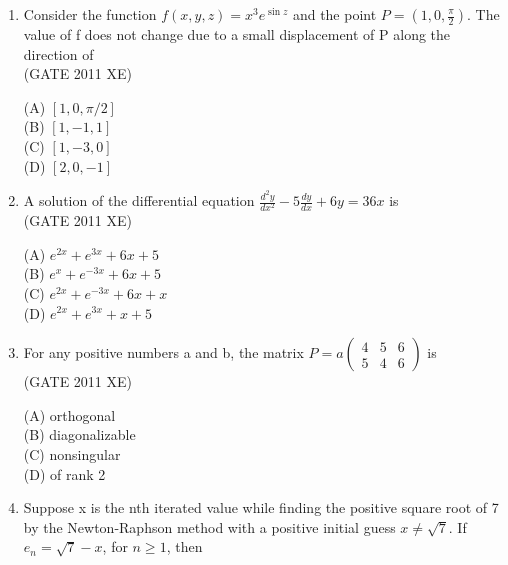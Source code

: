 \documentclass[journal,12pt,onecolumn]{IEEEtran}
\newcommand{\myvec}[1]{\begin{pmatrix}#1\end{pmatrix}}
\begin{document}
\begin{enumerate}
\hfill{(GATE 2011 XE)} \\
\begin{multicols}{4}
(A) $2\pi i$ \\
(B) $20\pi i$ \\
(C) $13\pi i$ \\
(D) 0
\end{multicols}

\item Consider the function $f(x,y,z) = x^3 e^{\sin z}$ and the point $P = (1,0, \frac{\pi}{2})$. The value of f does not change due to a small displacement of P along the direction of \\

\hfill{(GATE 2011 XE)} \\
\begin{multicols}{4}
(A) $[1,0,\pi/2]$ \\
(B) $[1,-1,1]$ \\
(C) $[1,-3,0]$ \\
(D) $[2,0,-1]$
\end{multicols}

\newpage

\item A solution of the differential equation $\frac{d^2 y}{dx^2} - 5 \frac{dy}{dx} + 6y = 36x$ is \\

\hfill{(GATE 2011 XE)} \\
\begin{multicols}{4}
(A) $e^{2x} + e^{3x} + 6x + 5$ \\
(B) $e^x + e^{-3x} + 6x + 5$ \\
(C) $e^{2x} + e^{-3x} + 6x + x$ \\
(D) $e^{2x} + e^{3x} + x + 5$
\end{multicols}

\item For any positive numbers a and b, the matrix 
$P = a\myvec{4 & 5 & 6 \\ 5 & 4 & 6}$ is \\

\hfill{(GATE 2011 XE)} \\
\begin{multicols}{4}
(A) orthogonal \\
(B) diagonalizable \\
(C) nonsingular \\
(D) of rank 2
\end{multicols}

\item Suppose x is the nth iterated value while finding the positive square root of 7 by the Newton-Raphson method with a positive initial guess $x \neq \sqrt{7}$. If $e_n = \sqrt{7} - x$, for $n \geq 1$, then \\


\end{enumerate}
\end{document}
